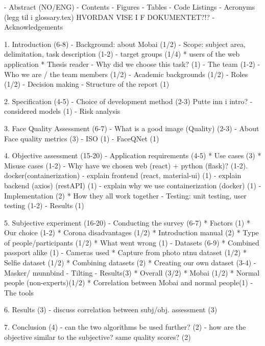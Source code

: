 - Abstract (NO/ENG)
- Contents
- Figures
- Tables
- Code Listings
- Acronyms (legg til i glossary.tex) HVORDAN VISE I F DOKUMENTET?!?
- Acknowledgements

1. Introduction (6-8)
 - Background: about Mobai (1/2)
 - Scope: subject area, delimitation, task description (1-2)
 - target groups (1/4)
    * users of the web application
    * Thesis reader
 - Why did we choose this task? (1)
 - The team (1-2)
   - Who we are / the team members (1/2)
   - Academic backgrounds (1/2)
   - Roles (1/2)
   - Decision making
 - Structure of the report (1)
 
 2. Specification (4-5)
    - Choice of development method (2-3) Putte inn i intro?
        - considered models (1)
    - Risk analysis
    
    
3. Face Quality Assessment (6-7)
    - What is a good image (Quality) (2-3)
    - About Face quality metrics (3)
        - ISO (1)
        - FaceQNet (1)
  
  
4. Objective assessment (15-20)
    - Application requirements (4-5)
        * Use cases (3)
        * Misuse cases (1-2)
    - Why have we chosen web (react) + python (flask)? (1-2). docker(containerization) 
    - explain frontend (react, material-ui) (1)
    - explain backend (axios) (restAPI) (1)
    - explain why we use containerization (docker) (1)
    - Implementation (2)
        * How they all work together
    - Testing: unit testing, user testing (1-2)
    - Results (1)
    

5. Subjective experiment (16-20)
   - Conducting the survey  (6-7)
        * Factors (1) 
        * Our choice (1-2) 
        * Corona disadvantages (1/2)
        * Introduction manual (2) 
        * Type of people/participants (1/2)
        * What went wrong (1)
    - Datasets (6-9)
        * Combined passport alike (1)
            - Cameras used
        * Capture from photo ntnu dataset (1/2)
        * Selfie dataset (1/2)
        * Combining datasets (2)
        * Creating our own dataset (3-4)
            - Masker/ munnbind 
            - Tilting 
    - Results(3) 
        * Overall (3/2)
        * Mobai (1/2)
        * Normal people (non-experts)(1/2)
        * Correlation between Mobai and normal people(1)
            - The tools
 
6. Results (3)
     - discuss correlation between subj/obj. assessment (3)
  
7. Conclusion (4)
    - can the two algorithms be used further? (2)
    - how are the objective similar to the subjective? same quality scores? (2)
  
 
 
 
